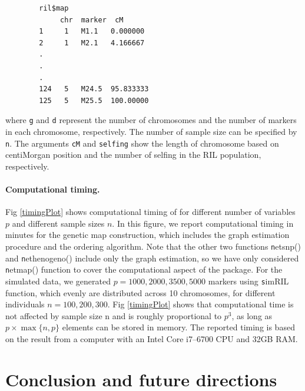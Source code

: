 \begin{enumerate}
	\begin{verbatim}
		ril$map
		     chr  marker  cM
		1     1   M1.1   0.000000
		2     1   M2.1   4.166667
		.
		. 
		.
		124   5   M24.5  95.833333
		125   5   M25.5  100.00000
	\end{verbatim}
	
	where {\tt g} and {\tt d} represent the number of chromosomes and the number of markers in each chromosome, respectively. The number of sample size can be specified by {\tt n}. The arguments {\tt cM} and {\tt selfing} show the length of chromosome based on centiMorgan position and the number of selfing in the RIL population, respectively. 
\end{enumerate}


\paragraph{Computational timing.} Fig \ref{timingPlot} shows computational timing of  for different number of variables $p$ and different sample sizes $n$. In this figure, we report computational timing in minutes for the genetic map construction,  which includes the graph estimation procedure and the ordering algorithm. Note that the other two functions  {\texttt netsnp()} and {\texttt nethenogeno()} include only the graph estimation, so we have only considered  {\texttt netmap()} function to cover the computational aspect of the  package. For the simulated data, we generated $p=1000, 2000, 3500, 5000$ markers using {\texttt simRIL} function, which evenly are distributed across 10 chromosomes, for different individuals $n=100, 200, 300$.  %
Fig \ref{timingPlot} shows that computational time is not affected by sample size n and is roughly proportional to $p^3$, as long as $p \times \max\{n,p\}$ elements can be stored in memory. The reported timing is based on the result from a computer with an Intel Core i7--6700 CPU and 32GB RAM. %

\section{Conclusion and future directions}
\label{Discussion}

